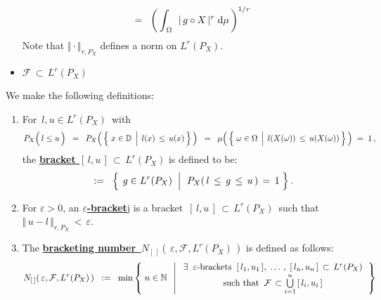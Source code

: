 \begin{definition}
\begin{itemize}
\begin{equation*}
	\; = \;\;
		\left(\,\int_{\,\Omega}\;\, \vert\,g \circ X\,\vert^{r} \;\textnormal{d}\mu\,\right)^{1/r}
	\end{equation*}
	Note that $\Vert\cdot\Vert_{r,P_{X}}$ defines a norm on $L^{r}(P_{X})$. 
\item
	$\mathcal{F} \,\subset\, L^{r}(P_{X})$
\end{itemize}
We make the following definitions:
\begin{enumerate}
\item
	For \,$l, u \in L^{r}(P_{X})$\, with
	\begin{equation*}
	P_{X}\!\left(\,l \overset{{\color{white}.}}{\leq} u\,\right)
	\;\;=\;\;
		P_{X}\!\left(\,\left\{\,\left. x\overset{{\color{white}.}}{\in}\D \;\,\right\vert\; l(x) \,\leq\, u(x)\,\right\}\,\right)
	\;\;=\;\;
		\mu\!\left(\,\left\{\,
			\left.
			\omega\overset{{\color{white}.}}{\in}\Omega
			\;\,\right\vert\;
			l(X(\omega)) \,\leq\, u(X(\omega))
		\,\right\}\,\right)
	\;=\; 1\,,
	\end{equation*}
	the \underline{\textbf{bracket $[\,l,u\,] \,\subset\,L^{r}(P_{X})$}} is defined to be:
	\begin{equation*}
	[\,l,u\,]
	\;\; := \;\;
		\left\{\;
		\left.
			g \overset{{\color{white}.}}{\in} L^{r}(P_{X})
		\;\;\right\vert\;\,
			P_{X}(\,l \,\overset{{\color{white}.}}{\leq}\, g \,\leq\, u\,) \,=\, 1
		\;\right\}.
	\end{equation*}
\item
	For $\varepsilon > 0$, an \underline{\textbf{$\varepsilon$-bracket}{\color{white}j}}
	is a bracket \,$[\,l,u\,] \,\subset\, L^{r}(P_{X})$\, such that
	\,$\Vert\,u-l\,\Vert_{r,P_{X}} \,<\,\varepsilon$.
\item
	The \underline{\textbf{bracketing number
	\,$N_{[\,]}\!\left(\,\varepsilon,\mathcal{F},L^{r}(P_{X})\,\right)$}}
	is defined as follows:
	\begin{equation*}
	N_{[\,]}\!\left(\,\varepsilon,\mathcal{F},L^{r}(P_{X})\,\right)
	\;\; := \;\;
		\min\left\{\;
			n \overset{{\color{white}.}}{\in} \N
		\;\;\left\vert\;
			\begin{array}{c}
				\exists\;\; \textnormal{$\varepsilon$-brackets}\;\;
				[\,l_{1},u_{1}\,],\; \ldots\,,\; [\,l_{n},u_{n}\,] \,\subset\, L^{r}(P_{X})
			\\
				\overset{{\color{white}1}}{\textnormal{such that}}\;\;
				\mathcal{F} \,\subset \overset{n}{\underset{i=1}{\bigcup}}\,[\,l_{i},u_{i}\,]
			\end{array}
		\right.
		\right\}
	\end{equation*}
\end{enumerate}
\end{definition}

